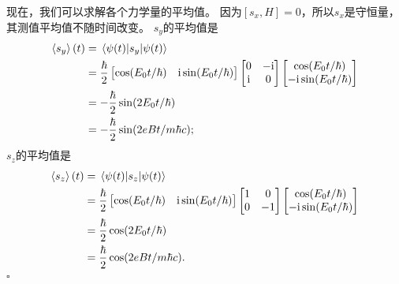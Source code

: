 \begin{tcolorbox}[breakable, title={\textbf{自旋}}]
    现在，我们可以求解各个力学量的平均值。
    因为$[s_x,H]=0$，所以$s_x$是守恒量，其测值平均值不随时间改变。
    $s_y$的平均值是
    \begin{equation}
    \begin{aligned}
        \expval{s_y}(t)
        &= \mel{\psi(t)}{s_y}{\psi(t)} \\
        &= \frac{\hbar}{2}
        \begin{bmatrix}
            \cos(E_0 t/\hbar) & \mathrm{i}\sin(E_0 t/\hbar)
        \end{bmatrix}
        \begin{bmatrix}
            0 & -\mathrm{i} \\ \mathrm{i} & 0\\
        \end{bmatrix}
        \begin{bmatrix}
            \cos(E_0 t/\hbar) \\ -\mathrm{i}\sin(E_0 t/\hbar)
        \end{bmatrix} \\
        &= -\frac{\hbar}{2} \sin(2E_0 t/\hbar) \\
        &= -\frac{\hbar}{2} \sin(2 eBt/m\hbar c);
    \end{aligned}
    \end{equation}
    $s_z$的平均值是
    \begin{equation}
    \begin{aligned}
        \expval{s_z}(t)
        &= \mel{\psi(t)}{s_z}{\psi(t)} \\
        &= \frac{\hbar}{2}
        \begin{bmatrix}
            \cos(E_0 t/\hbar) & \mathrm{i}\sin(E_0 t/\hbar)
        \end{bmatrix}
        \begin{bmatrix}
            1 & 0 \\ 0 & -1\\
        \end{bmatrix}
        \begin{bmatrix}
            \cos(E_0 t/\hbar) \\ -\mathrm{i}\sin(E_0 t/\hbar)
        \end{bmatrix} \\
        &= \frac{\hbar}{2} \cos(2E_0 t/\hbar) \\
        &= \frac{\hbar}{2} \cos(2 eBt/m\hbar c).
    \end{aligned}
    \end{equation}
    \hfill $\square$

\end{tcolorbox}
